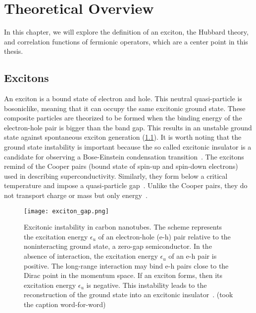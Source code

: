 
\chapter{Theoretical Overview}
\label{sec:theory}
\newcommand{\todo}[1]{\textbf{\color{red}TODO: #1}}

In this chapter, we will explore the definition of an exciton, the Hubbard theory, and correlation functions of fermionic operators, which are a center point in this thesis.

\section{Excitons}
An exciton is a bound state of electron and hole. This neutral quasi-particle is bosoniclike, meaning that it can occupy the same excitonic ground state. These composite particles are theorized to be formed when the binding energy of the electron-hole pair is bigger than the band gap. This results in an unstable ground state against spontaneous exciton generation (\cref{fig:exciton_gap}). It is worth noting that the ground state instability is important because the so called excitonic insulator is a candidate for observing a Bose-Einstein condensation transition~\cite{grossnev}. The excitons remind of the Cooper pairs (bound state of spin-up and spin-down electrons) used in describing superconductivity. Similarly, they form below a critical temperature and impose a quasi-particle gap~\cite{ctubes}. Unlike the Cooper pairs, they do not transport charge or mass but only energy~\cite{grossnev}. 
\begin{figure}[htbp]
    \centerline{\texttt{[image: exciton\_gap.png]}}
    \caption{Excitonic instability in carbon nanotubes. The scheme represents the excitation energy $\epsilon_u$ of an electron-hole (e-h) pair relative to the noninteracting ground state, a zero-gap semiconductor. In the absence of interaction, the excitation energy $\epsilon_u$ of an e-h pair is positive. The long-range interaction may bind e-h pairs close to the Dirac point in the momentum space. If an exciton forms, then its excitation energy $\epsilon_u$ is negative. This instability leads to the reconstruction of the ground state into an excitonic insulator~\cite{ctubes}. (took the caption word-for-word)}
    \label{fig:exciton_gap}
\end{figure}

